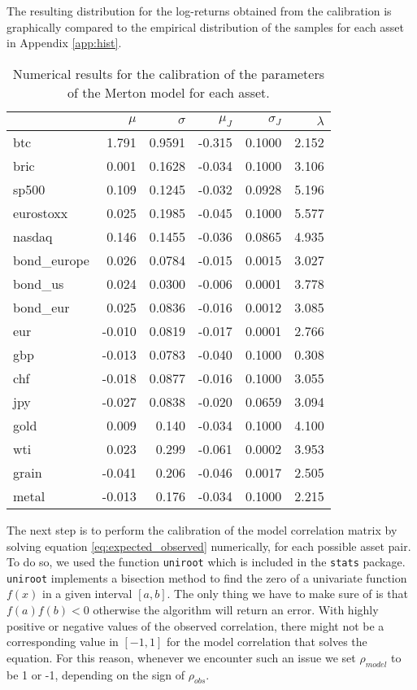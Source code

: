 The resulting distribution for the log-returns obtained from the calibration is graphically  compared to the empirical distribution of the samples for each asset in Appendix \ref{app:hist}.
\bigskip


\begin{table}
	\small
	\centering
	\caption[Merton calibrated parameters]{Numerical results for the calibration of the parameters of the Merton model for each asset.}
	\begin{tabular}{lrrrrr}
		& $\mu$ & $\sigma$ & $\mu_{J}$ & $\sigma_{J}$ & $\lambda$ \\
		\midrule
		btc & 1.791 & 0.9591 & -0.315 & 0.1000 & 2.152 \\
		bric & 0.001 & 0.1628 & -0.034 & 0.1000 & 3.106 \\
		sp500 & 0.109 & 0.1245 & -0.032 & 0.0928 & 5.196 \\
		eurostoxx & 0.025 & 0.1985 & -0.045 & 0.1000 & 5.577 \\
		nasdaq & 0.146 & 0.1455 & -0.036 & 0.0865 & 4.935 \\
		bond\_europe & 0.026 & 0.0784 & -0.015 & 0.0015 & 3.027 \\
		bond\_us & 0.024 & 0.0300 & -0.006 & 0.0001 & 3.778 \\
		bond\_eur & 0.025 & 0.0836 & -0.016 & 0.0012 & 3.085 \\
		eur & -0.010 & 0.0819 & -0.017 & 0.0001 & 2.766 \\
		gbp & -0.013 & 0.0783 & -0.040 & 0.1000 & 0.308 \\
		chf & -0.018 & 0.0877 & -0.016 & 0.1000 & 3.055 \\
		jpy & -0.027 & 0.0838 & -0.020 & 0.0659 & 3.094 \\
		gold & 0.009 & 0.140 & -0.034 & 0.1000 & 4.100 \\
		wti & 0.023 & 0.299 & -0.061 & 0.0002 & 3.953 \\
		grain & -0.041 & 0.206 & -0.046 & 0.0017 & 2.505 \\
		metal & -0.013 & 0.176 & -0.034 & 0.1000 & 2.215 \\
		\midrule
	\end{tabular}
\label{tab:merton_params}
\end{table}

The next step is to perform the calibration of the model correlation matrix by solving equation \eqref{eq:expected_observed} numerically, for each possible asset pair.
To do so, we used the function \texttt{uniroot} which is included in the \texttt{stats} package. \texttt{uniroot} implements a bisection method to find the zero of a univariate function $f(x)$ in a given interval $[a,b]$. The only thing we have to make sure of is that $f(a)f(b)< 0 $ otherwise the algorithm will return an error.
With highly positive or negative values of the observed correlation, there might not be a corresponding value in $[-1,1]$ for the model correlation that solves the equation. For this reason, whenever we encounter such an issue we set $\rho_{model}$ to be 1 or -1, depending on the sign of $\rho_{obs}$.

